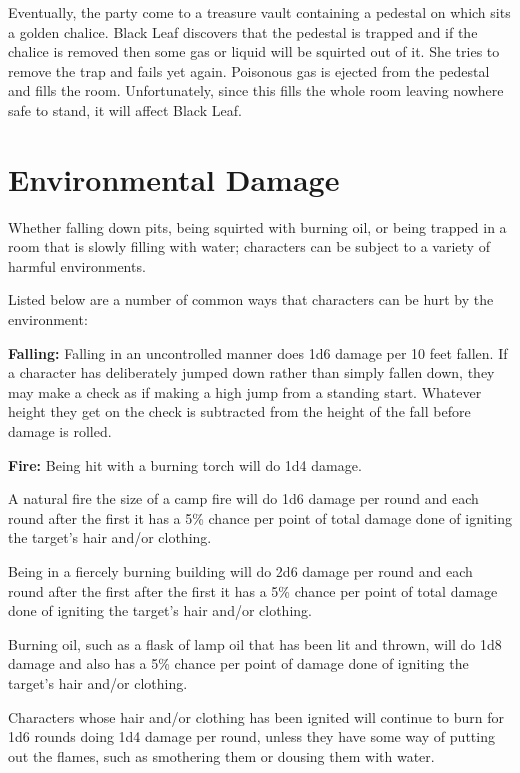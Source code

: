 \begin{multicols*}{2}
{Eventually, the party come to a treasure vault containing a pedestal on which sits a golden chalice. Black Leaf discovers that the pedestal is trapped and if the chalice is removed then some gas or liquid will be squirted out of it. She tries to remove the trap and fails yet again. Poisonous gas is ejected from the pedestal and fills the room. Unfortunately, since this fills the whole room leaving nowhere safe to stand, it will affect Black Leaf.}

\section{Environmental Damage}\label{sec:Environmental Damage}
Whether falling down pits, being squirted with burning oil, or being trapped in a room that is slowly filling with water; characters can be subject to a variety of harmful environments.

Listed below are a number of common ways that characters can be hurt by the environment:

\textbf{Falling:} Falling in an uncontrolled manner does 1d6 damage per 10 feet fallen. If a character has deliberately jumped down rather than simply fallen down, they may make a  check as if making a high jump from a standing start. Whatever height they get on the  check is subtracted from the height of the fall before damage is rolled.

\textbf{Fire:} Being hit with a burning torch will do 1d4 damage.

A natural fire the size of a camp fire will do 1d6 damage per round and each round after the first it has a 5\% chance per point of total damage done of igniting the target’s hair and/or clothing.

Being in a fiercely burning building will do 2d6 damage per round and each round after the first after the first it has a 5\% chance per point of total damage done of igniting the target’s hair and/or clothing.

Burning oil, such as a flask of lamp oil that has been lit and thrown, will do 1d8 damage and also has a 5\% chance per point of damage done of igniting the target’s hair and/or clothing.

Characters whose hair and/or clothing has been ignited will continue to burn for 1d6 rounds doing 1d4 damage per round, unless they have some way of putting out the flames, such as smothering them or dousing them with water.


\end{multicols*}

